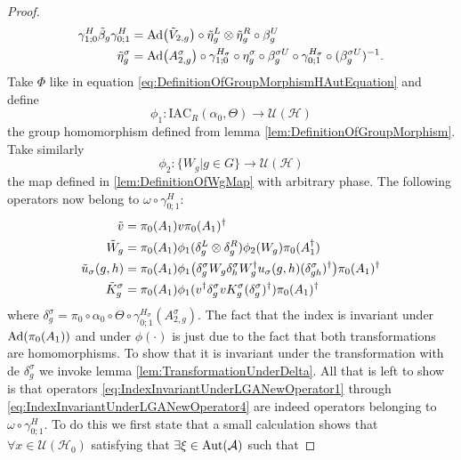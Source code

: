 \documentclass[12pt,a4paper,twoside]{article}
\newcommand{\IAC}{\textrm{IAC}}
\let\originalleft\left
\let\originalright\right
\renewcommand{\left}{\mathopen{}\mathclose\bgroup\originalleft}
\renewcommand{\right}{\aftergroup\egroup\originalright}
\newcommand{\UU}{\mathcal U}
\newcommand{\HH}{\mathcal H}
\renewcommand{\AA}{\mathcal A}
\newcommand{\Ad}[1]{\textrm{Ad}\left(#1\right)}
\newcommand{\Aut}[1]{\textrm{Aut}\left(#1\right)}
\theoremstyle{definition}
\numberwithin{equation}{section}
\begin{document}
\begin{proof}
	\begin{align}
		\label{eq:IndexInvariantUnderLGAEtaTildeDefiniton1}
		\gamma^{H}_{1;0}\tilde{\beta}_g\gamma^{H}_{0;1}&=\Ad{\tilde V_{2,g}}\circ\tilde{\eta}_g^L\otimes\tilde{\eta}_g^R\circ\beta_g^U\\
		\label{eq:IndexInvariantUnderLGAEtaTildeDefiniton2}
		\tilde{\eta}_g^\sigma&=\Ad{A_{2,g}^\sigma}\circ\gamma^{H_\sigma}_{1;0}\circ\eta_g^\sigma\circ\beta_g^{\sigma U}\circ\gamma^{H_\sigma}_{0;1}\circ(\beta_g^{\sigma U})^{-1}.
	\end{align}
	Take $\Phi$ like in equation \eqref{eq:DefinitionOfGroupMorphismHAutEquation} and define
	\begin{equation}
		\phi_1:\IAC_R(\alpha_0,\Theta) \rightarrow \UU(\HH)
	\end{equation}
	the group homomorphism defined from lemma \ref{lem:DefinitionOfGroupMorphism}. Take similarly
	\begin{equation}
		\phi_2:\{W_g|g\in G\}\rightarrow \UU(\HH)
	\end{equation}
	the map defined in \ref{lem:DefinitionOfWgMap} with arbitrary phase. The following operators now belong to $\omega\circ\gamma^{H}_{0;1}:$
	\begin{align}
		\label{eq:IndexInvariantUnderLGANewOperator1}
		\tilde{v}&=\pi_0(A_1)v\pi_0(A_1)^\dagger\\
		\label{eq:IndexInvariantUnderLGANewOperator2}
		\tilde{W}_g&=\pi_0(A_1)\phi_1(\delta^L_g\otimes\delta^R_g)\phi_2( W_g)\pi_0(A_1^\dagger)\\
		\label{eq:IndexInvariantUnderLGANewOperator3}
		\tilde u_\sigma(g,h)&=\pi_0(A_1) \phi_1\left(\delta^\sigma_g W_g\delta^\sigma_h W_g^\dagger u_\sigma(g,h)(\delta^\sigma_{gh})^\dagger\right)\pi_0(A_1)^\dagger\\
		\label{eq:IndexInvariantUnderLGANewOperator4}
		\tilde{K}_g^\sigma&=\pi_0(A_1)\phi_1(v^\dagger \delta_g^\sigma v K_g^\sigma (\delta_g^\sigma)^\dagger) \pi_0(A_1)^\dagger
	\end{align}
	where $\delta^\sigma_g=\pi_0\circ\alpha_0\circ\Theta\circ\gamma^{H_\sigma}_{0;1}(A^\sigma_{2,g}).$ The fact that the index is invariant under $\Ad{\pi_0(A_1)}$ and under $\phi(\cdot)$ is just due to the fact that both transformations are homomorphisms. To show that it is invariant under the transformation with de $\delta^\sigma_g$ we invoke lemma \ref{lem:TransformationUnderDelta}. All that is left to show is that operators \eqref{eq:IndexInvariantUnderLGANewOperator1} through \eqref{eq:IndexInvariantUnderLGANewOperator4} are indeed operators belonging to $\omega\circ\gamma^{H}_{0;1}$. To do this we first state that a small calculation shows that $\forall x\in\UU(\HH_0)$ satisfying that $\exists\xi\in\Aut{\AA}$ such that

\end{proof}
\end{document}
